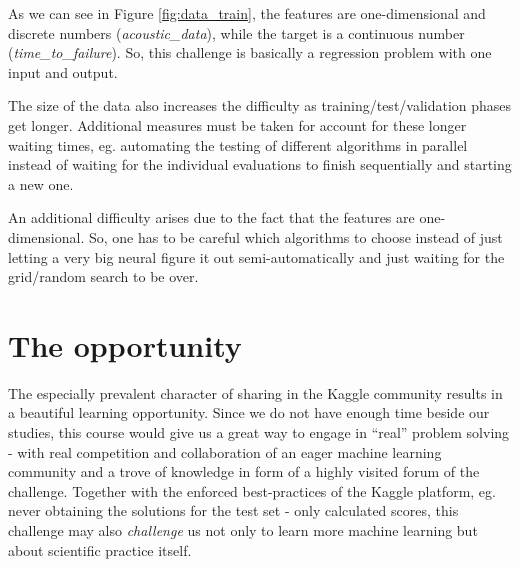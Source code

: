 \documentclass[colorback,accentcolor=tud9c,12pt]{tudreport}
\begin{document}
	
	As we can see in Figure \ref{fig:data_train}, the features are one-dimensional and discrete numbers (\textit{acoustic\_data}), while the target is a continuous number (\textit{time\_to\_failure}).
	So, this challenge is basically a regression problem with one input and output.
	
	
	The size of the data also increases the difficulty as training/test/validation phases get longer. Additional measures must be taken for account for these longer waiting times, eg. automating the testing of different algorithms in parallel instead of waiting for the individual evaluations to finish sequentially and starting a new one.
	
	An additional difficulty arises due to the fact that the features are one-dimensional. So, one has to be careful which algorithms to choose instead of just letting a very big neural figure it out semi-automatically and just waiting for the grid/random search to be over.
	
	\section{The opportunity}
	The especially prevalent character of sharing in the Kaggle community results in a beautiful learning opportunity. Since we do not have enough time beside our studies, this course would give us a great way to engage in ``real'' problem solving - with real competition and collaboration of an eager machine learning community and a trove of knowledge in form of a highly visited forum of the challenge.
	Together with the enforced best-practices of the Kaggle platform, eg. never obtaining the solutions for the test set - only calculated scores, this challenge may also \textit{challenge} us not only to learn more machine learning but about scientific practice itself.
	
	
\end{document}
